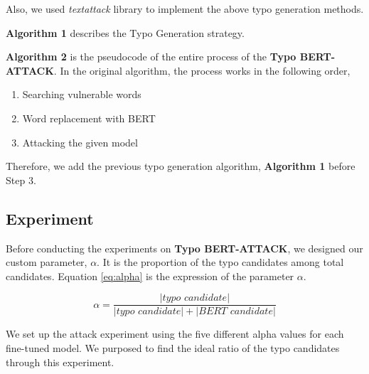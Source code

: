 \documentclass[11pt,a4paper]{article}
\begin{document}
Also, we used \textit{textattack} library \cite{morris2020textattack} to implement the above typo generation methods.

\textbf{Algorithm 1} describes the Typo Generation strategy.



\textbf{Algorithm 2} is the pseudocode of the entire process of the \textbf{Typo BERT-ATTACK}.
In the original algorithm, the process works in the following order,
\begin{enumerate}
    \item Searching vulnerable words
    \item Word replacement with BERT
    \item Attacking the given model
\end{enumerate}

Therefore, we add the previous typo generation algorithm, \textbf{Algorithm 1} before Step 3.

\subsection{Experiment}

Before conducting the experiments on \textbf{Typo BERT-ATTACK}, we designed our custom parameter, $\alpha$. 
It is the proportion of the typo candidates among total candidates.
Equation \ref{eq:alpha} is the expression of the parameter $\alpha$.

\begin{equation}
\label{eq:alpha}
    \alpha = \frac{|\textit{typo candidate}|}{|\textit{typo candidate}| + |\textit{BERT candidate}|}
\end{equation}

We set up the attack experiment using the five different alpha values for each fine-tuned model. We purposed to find the ideal ratio of the typo candidates through this experiment. 
\end{document}
